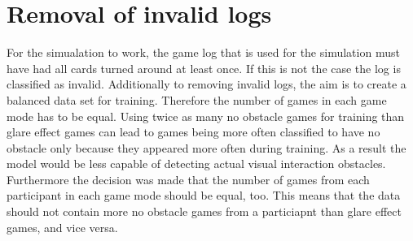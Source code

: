 
\section{Removal of invalid logs}
\label{removal_of_invalid_logs}
For the simualation to work, the game log that is used for the simulation must have had all cards turned around at least once. If this is not the case the log is classified as invalid. Additionally to removing invalid logs, the aim is to create a balanced data set for training. Therefore the number of games in each game mode has to be equal. Using twice as many no obstacle games for training than glare effect games can lead to games being more often classified to have no obstacle only because they appeared more often during training. As a result the model would be less capable of detecting actual visual interaction obstacles. Furthermore the decision was made that the number of games from each participant in each game mode should be equal, too. This means that the data should not contain more no obstacle games from a particiapnt than glare effect games, and vice versa.

